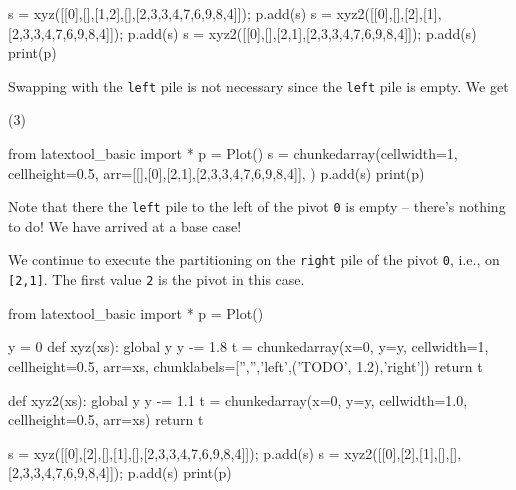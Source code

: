 \begin{ex}
{\begin{python}
s = xyz([[0],[],[1,2],[],[2,3,3,4,7,6,9,8,4]]); p.add(s)
s = xyz2([[0],[],[2],[1],[2,3,3,4,7,6,9,8,4]]); p.add(s)
s = xyz2([[0],[],[2,1],[2,3,3,4,7,6,9,8,4]]); p.add(s)
print(p)
\end{python}
}
Swapping with the \verb!left! pile is not necessary since the 
\verb!left! pile is empty.
We get
\begin{center}
(3)
\end{center}
\begin{python}
from latextool_basic import *
p = Plot()
s = chunkedarray(cellwidth=1,
                   cellheight=0.5,
                   arr=[[],[0],[2,1],[2,3,3,4,7,6,9,8,4]],
)
p.add(s)
print(p)
\end{python}
Note that there the \verb!left! pile to the left of the pivot \verb!0!
is empty -- there's nothing to do!
We have arrived at a base case!

We continue to execute the partitioning on the \verb!right! pile 
of the pivot \verb!0!,
i.e., on \verb![2,1]!.
The first value \verb!2! is the pivot in this case.
{\small
\begin{python}
from latextool_basic import *
p = Plot()

y = 0
def xyz(xs):
    global y
    y -= 1.8
    t = chunkedarray(x=0, y=y,
                        cellwidth=1, 
                        cellheight=0.5,
                        arr=xs,
                        chunklabels=['','','left',('TODO', 1.2),'right'])
    return t

def xyz2(xs):
    global y
    y -= 1.1
    t = chunkedarray(x=0, y=y,
                        cellwidth=1.0, 
                        cellheight=0.5,
                        arr=xs)
    return t

s = xyz([[0],[2],[],[1],[],[2,3,3,4,7,6,9,8,4]]); p.add(s)
s = xyz2([[0],[2],[1],[],[],[2,3,3,4,7,6,9,8,4]]); p.add(s)
print(p)
\end{python}
}



\end{ex}

